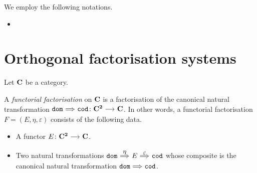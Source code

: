 \documentclass[a4paper,dvipsnames, 11pt]{amsart} %
\begin{document}
\maketitle
\begin{notation}
	We employ the following notations. 
	\begin{itemize}
		\item %
	\end{itemize}
\end{notation}
\section{Orthogonal factorisation systems}
Let $\mathbf{C}$ be a category.
\begin{definition}
	A \emph{functorial factorisation} on $\mathbf{C}$
	is a factorisation of the canonical natural transformation
	$\dom\arr[Rightarrow]\cod\colon\one{C}^\one{2}\arr\one{C}$.
	In other words, a functorial factorisation $F=(E,\eta,\varepsilon)$
	consists of the following data.
	\begin{itemize}
		\item %
			A functor $E\colon\one{C}^\one{2}\arr\one{C}$.
		\item %
			Two natural transformations
			$\dom\arr"\eta"[Rightarrow] E\arr"\varepsilon"[Rightarrow]\cod$
			whose composite is the canonical natural transformation $\dom\arr[Rightarrow]\cod$.
		\qedhere %
	\end{itemize}
\end{definition}
\end{document}
